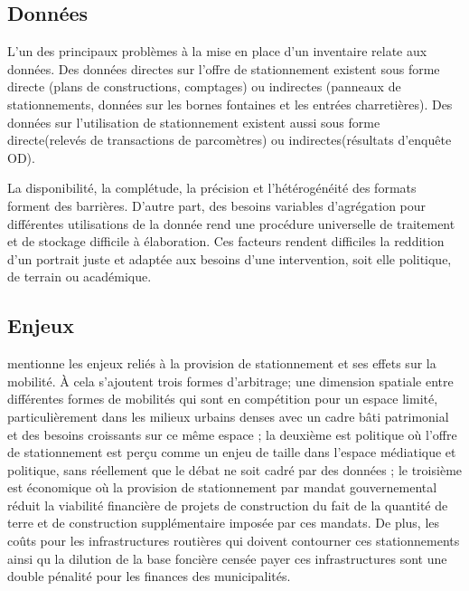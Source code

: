 \subsection{Données}

L'un des principaux problèmes à la mise en place d'un inventaire relate aux données. Des données directes sur l'offre de stationnement existent sous forme directe (plans de constructions, comptages) ou indirectes (panneaux de stationnements, données sur les bornes fontaines et les entrées charretières). Des données sur l'utilisation de stationnement existent aussi sous forme directe(relevés de transactions de parcomètres) ou indirectes(résultats d'enquête OD).\par
La disponibilité, la complétude, la précision et l'hétérogénéité des formats forment des barrières. D'autre part, des besoins variables d'agrégation pour différentes utilisations de la donnée rend une procédure universelle de traitement et de stockage difficile à élaboration. Ces facteurs rendent difficiles la reddition d'un portrait juste et adaptée aux besoins d'une intervention, soit elle politique, de terrain ou académique.

\subsection{Enjeux}

\textcite{Bourdeau:MethodologieAnalyse:2014} mentionne les enjeux reliés à la provision de  stationnement et ses effets sur la mobilité. À cela s'ajoutent trois formes d'arbitrage; une dimension spatiale entre différentes formes de mobilités qui sont en compétition pour un espace limité, particulièrement dans les milieux urbains denses avec un cadre bâti patrimonial et des besoins croissants sur ce même espace ; la deuxième est politique où l'offre de stationnement est perçu comme un enjeu de taille dans l'espace médiatique et politique, sans réellement que le débat ne soit cadré par des données ; le troisième est économique où la provision de stationnement par mandat gouvernemental réduit la viabilité financière de projets de construction du fait de la quantité de terre et de construction supplémentaire imposée par ces mandats. De plus, les coûts pour les infrastructures routières qui doivent contourner ces stationnements  \fg{} ainsi qu la dilution de la base foncière censée payer ces infrastructures sont une double pénalité pour les finances des municipalités. 



